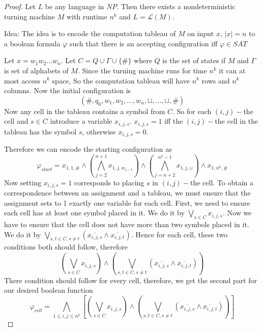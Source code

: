 \documentclass{article}
\begin{document}
\begin{proof}
		Let \(L\) be any language in \(NP\). Then there exists a nondeterministic turning machine \(M\) with runtime \(n^k\) and \(L=\mathcal{L}(M)\).
	
	Idea: The idea is to encode the computation tableau of \(M\) on input \(x\), \(|x|=n\) to a boolean formula \(\varphi\) such that there is an accepting configuration iff \(\varphi \in SAT\)
	
	
	
	Let \(x=w_1w_2\dots w_n\). Let \(C=Q\cup \Gamma\cup \{\#\}\) where \(Q\) is the set of states if \(M\) and \(\Gamma\) is set of alphabets of \(M\). Since the turning machine runs for time \(n^k\) it can at most access \(n^k\) space, So the computation tableau will have \(n^k \) rows and \(n^k\) columns. Now the initial configuration is \[(\#,q_0,w_1,w_2,\dots,w_n,\sqcup,\dots,\sqcup,\#)\]Now any cell in the tableau contains a symbol from \(C\). So for each \((i,j)-\)the cell and \(s\in C\) introduce a variable \(x_{i,j,s}\). \(x_{i,j,s}=1\) iff the \((i,j)-\)the cell in the tableau has the symbol \(s\), otherwise \(x_{i,j,s}=0\).
	
	
	
	Therefore we can encode the starting configuration as \[\varphi_{start}=x_{1,1,\#}\wedge \left( \bigwedge_{j=2}^{n+1} x_{1,j,w_{j-1}} \right) \wedge \left( \bigwedge_{j=n+2}^{n^k-1} x_{1, j,\sqcup} \right)\wedge x_{1,n^k,\#}\]Now setting \(x_{i,j,s} =1\) corresponds to placing \(s\) in \((i,j)-\)the cell. To obtain a correspondence between an assignment and a tableau, we must ensure that the assignment sets to 1 exactly one variable for each cell. First, we need to ensure each cell has at least one symbol placed in it. We do it by \(\bigvee\limits_{s\in C} x_{i,j,s}\). Now we have to ensure that the cell does not have more than two symbols placed in it. We do it by \(\bigvee\limits_{s,t\in C, s\neq t} (\overline{x_{i,j,s}}\wedge\overline{x_{i,j,t}})\). Hence for each cell, these two conditions both should follow, therefore \[\left(\bigvee\limits_{s\in C} x_{i,j,s}\right) \wedge \left( \bigvee\limits_{s,t\in C, s\neq t} (\overline{x_{i,j,s}}\wedge\overline{x_{i,j,t}})\right)\]There condition should follow for every cell, therefore, we get the second part for our desired boolean function \[ \varphi_{cell}=\bigwedge_{1\leq i,j\leq n^k}\left[ \left(\bigvee\limits_{s\in C} x_{i,j,s}\right) \wedge \left( \bigvee\limits_{s,t\in C, s\neq t} (\overline{x_{i,j,s}}\wedge\overline{x_{i,j,t}})\right)\right]\]
	

\end{proof}
\end{document}
